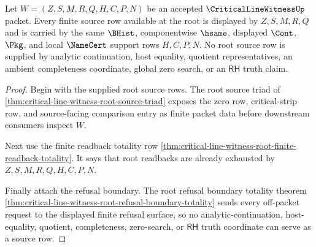 \begin{theorem}
\label{thm:critical-line-witness-root-source-totality}
Let $W=(Z,S,M,R,Q,H,C,P,N)$ be an accepted $\CriticalLineWitnessUp$ packet. Every finite source row available at the root is displayed by $Z,S,M,R,Q$ and is carried by the same $\BHist$, componentwise $\hsame$, displayed $\Cont$, $\Pkg$, and local $\NameCert$ support rows $H,C,P,N$. No root source row is supplied by analytic continuation, host equality, quotient representatives, an ambient completeness coordinate, global zero search, or an $\mathsf{RH}$ truth claim.
\end{theorem}
\begin{proof}
Begin with the supplied root source rows. The root source triad of \autoref{thm:critical-line-witness-root-source-triad} exposes the zero row, critical-strip row, and source-facing comparison entry as finite packet data before downstream consumers inspect $W$.

Next use the finite readback totality row \autoref{thm:critical-line-witness-root-finite-readback-totality}. It says that root readbacks are already exhausted by $Z,S,M,R,Q,H,C,P,N$.

Finally attach the refusal boundary. The root refusal boundary totality theorem \autoref{thm:critical-line-witness-root-refusal-boundary-totality} sends every off-packet request to the displayed finite refusal surface, so no analytic-continuation, host-equality, quotient, completeness, zero-search, or $\mathsf{RH}$ truth coordinate can serve as a source row.
\end{proof}


